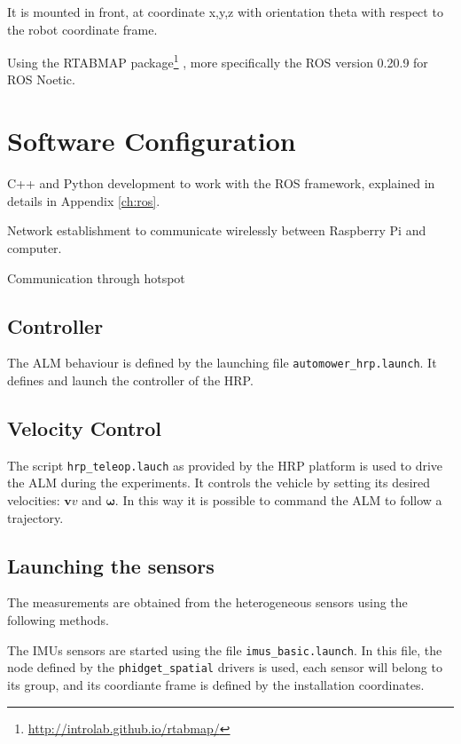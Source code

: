 It is mounted in front, at coordinate x,y,z with orientation theta with respect to the robot coordinate frame.

Using the \gls{RTABMAP} package\footnote{\url{http://introlab.github.io/rtabmap/}}\cite{6094602} \cite{labbe_rtab-map_2019}, more specifically the \gls{ROS} version 0.20.9 for \gls{ROS} Noetic.

\section{Software Configuration}
\noindent
C++ and Python development to work with the ROS framework, explained in details in Appendix \ref{ch:ros}.

Network establishment to communicate wirelessly between Raspberry Pi and computer.

Communication through hotspot



\subsection{Controller}
\label{sec:driver_safe}
\noindent The \gls{ALM} behaviour is defined by the launching file \texttt{automower\_hrp.launch}.
It defines and launch the controller of the \gls{HRP}.



\subsection{Velocity Control}
\label{sec:control}
\noindent
The script \texttt{hrp\_teleop.lauch} as provided by the \gls{HRP} platform is used to drive the \gls{ALM} during the experiments.
It controls the vehicle by setting its desired velocities: $\mathbf{v}v$ and $\boldsymbol \omega$.
In this way it is possible to command the \gls{ALM} to follow a trajectory.


\subsection{Launching the sensors}
\noindent The measurements are obtained from the heterogeneous sensors using the following methods.


The \glspl{IMU} sensors are started using the file \texttt{imus\_basic.launch}.
In this file, the node defined by the \texttt{phidget\_spatial} drivers is used, each sensor will belong to its group, and its coordiante frame is defined by the installation coordinates.

